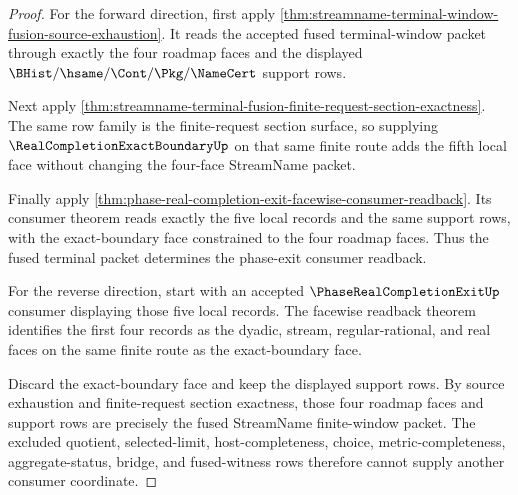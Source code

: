 \begin{proof}
For the forward direction, first apply
\autoref{thm:streamname-terminal-window-fusion-source-exhaustion}. It reads
the accepted fused terminal-window packet through exactly the four roadmap
faces and the displayed $\BHist/\hsame/\Cont/\Pkg/\NameCert$ support rows.

Next apply
\autoref{thm:streamname-terminal-fusion-finite-request-section-exactness}.
The same row family is the finite-request section surface, so supplying
$\RealCompletionExactBoundaryUp$ on that same finite route adds the fifth
local face without changing the four-face StreamName packet.

Finally apply
\autoref{thm:phase-real-completion-exit-facewise-consumer-readback}. Its
consumer theorem reads exactly the five local records and the same support
rows, with the exact-boundary face constrained to the four roadmap faces.
Thus the fused terminal packet determines the phase-exit consumer readback.

For the reverse direction, start with an accepted
$\PhaseRealCompletionExitUp$ consumer displaying those five local records.
The facewise readback theorem identifies the first four records as the dyadic,
stream, regular-rational, and real faces on the same finite route as the
exact-boundary face.

Discard the exact-boundary face and keep the displayed support rows. By source
exhaustion and finite-request section exactness, those four roadmap faces and
support rows are precisely the fused StreamName finite-window packet. The
excluded quotient, selected-limit, host-completeness, choice,
metric-completeness, aggregate-status, bridge, and fused-witness rows therefore
cannot supply another consumer coordinate.
\end{proof}

